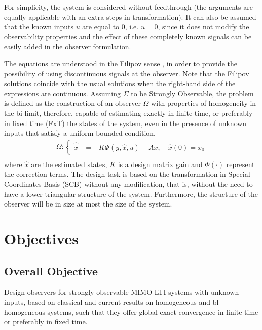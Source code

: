 \documentclass[11pt,letterpaper,twoside,openright]{report}
\begin{document}
For simplicity, the system is considered without feedthrough (the arguments are equally applicable with an extra steps in transformation). It can also be assumed that the known inputs $u$ are equal to 0, i.e. $u=0$, since it does not modify the observability properties and the effect of these completely known signals can be easily added in the observer formulation.

The equations are understood in the Filipov sense \cite{Filipov1988}, in order to provide the possibility of using discontinuous signals at the observer. Note that the Filipov solutions coincide with the usual solutions when the right-hand side of the expressions are continuous.
Assuming $\Sigma$ to be Strongly Observable, the problem is defined as the construction of an observer $\Omega$ with properties of homogeneity in the bi-limit, therefore, capable of estimating exactly in finite time, or preferably in fixed time (FxT) the states of the system, even in the presence of unknown inputs that satisfy a uniform bounded condition.
\begin{equation}\label{ecu: Omega}
\begin{split}
\Omega: \left\{
\begin{array}{rl}
\hat{\dot{x}} &= -K\Phi(y,\hat{x},u) + Ax,\quad \hat{x}(0)=x_0
\end{array}
\right. \\
\end{split}
\end{equation}
where $\hat{x}$ are the estimated states, $K$ is a design matrix gain and $\Phi(\cdot)$ represent the correction terms.
The design task is based on the transformation in Special Coordinates Basis (SCB) without any modification, that is, without the need to have a lower triangular structure of the system. Furthermore, the structure of the observer will be in size at most the size of the system.

\section{Objectives}
\subsection{Overall Objective}
Design observers for strongly observable MIMO-LTI systems with unknown inputs, based on classical and current results on homogeneous and bl-homogeneous systems, such that they offer global exact convergence in finite time or preferably in fixed time.
\end{document}
